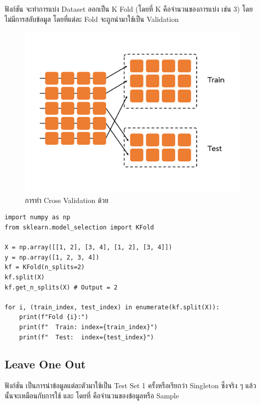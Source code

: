 ฟังก์ชัน  จะทำการแบ่ง Dataset ออกเป็น K Fold (โดยที่ K คือจำนวนของการแบ่ง เช่น 3) โดยไม่มีการสลับข้อมูล 
โดยที่แต่ละ Fold จะถูกนำมาใช้เป็น Validation

\begin{figure}[H]
    \centering
    \includegraphics[width=0.9\linewidth,page=4]{fig/cross_validation.pdf}
    \caption{การทำ Cross Validation ด้วย }
    \label{fig:f_fold}
\end{figure}

\begin{lstlisting}[style=MyPython]
import numpy as np
from sklearn.model_selection import KFold

X = np.array([[1, 2], [3, 4], [1, 2], [3, 4]])
y = np.array([1, 2, 3, 4])
kf = KFold(n_splits=2)
kf.split(X)
kf.get_n_splits(X) # Output = 2

for i, (train_index, test_index) in enumerate(kf.split(X)):
    print(f"Fold {i}:")
    print(f"  Train: index={train_index}")
    print(f"  Test:  index={test_index}")
\end{lstlisting}

\subsection{Leave One Out}
\label{ssec:leave_one_out}

ฟังก์ชัน  เป็นการนำข้อมูลแต่ละตัวมาใช้เป็น Test Set 1 ครั้งหรือเรียกว่า Singleton ซึ่งจริง ๆ แล้ว 
 นั้นจะเหมือนกับการใช้  และ  โดยที่ 
 คือจำนวนของข้อมูลหรือ Sample

